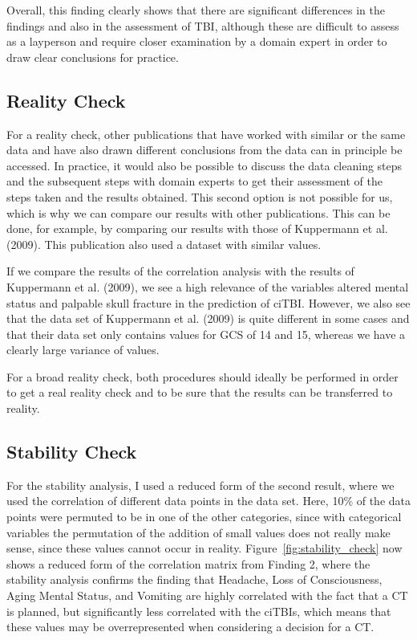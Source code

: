 \documentclass[10pt,letterpaper]{article}
\begin{document}
Overall, this finding clearly shows that there are significant differences in the findings and also in the assessment of TBI, although these are difficult to assess as a layperson and require closer examination by a domain expert in order to draw clear conclusions for practice. 

\subsection{Reality Check}\label{reality-check}

For a reality check, other publications that have worked with similar or the same data and have also drawn different conclusions from the data can in principle be accessed. In practice, it would also be possible to discuss the data cleaning steps and the subsequent steps with domain experts to get their assessment of the steps taken and the results obtained. This second option is not possible for us, which is why we can compare our results with other publications. This can be done, for example, by comparing our results with those of Kuppermann et al. (2009). This publication also used a dataset with similar values.

If we compare the results of the correlation analysis with the results of Kuppermann et al. (2009), we see a high relevance of the variables altered mental status and palpable skull fracture in the prediction of ciTBI. However, we also see that the data set of Kuppermann et al. (2009) is quite different in some cases and that their data set only contains values for GCS of 14 and 15, whereas we have a clearly large variance of values.

For a broad reality check, both procedures should ideally be performed in order to get a real reality check and to be sure that the results can be transferred to reality.

\subsection{Stability Check}\label{stability-check}

For the stability analysis, I used a reduced form of the second result, where we used the correlation of different data points in the data set. Here, 10\% of the data points were permuted to be in one of the other categories, since with categorical variables the permutation of the addition of small values does not really make sense, since these values cannot occur in reality. Figure~\ref{fig:stability_check} now shows a reduced form of the correlation matrix from Finding 2, where the stability analysis confirms the finding that Headache, Loss of Consciousness, Aging Mental Status, and Vomiting are highly correlated with the fact that a CT is planned, but significantly less correlated with the ciTBIs, which means that these values may be overrepresented when considering a decision for a CT. 
\end{document}
